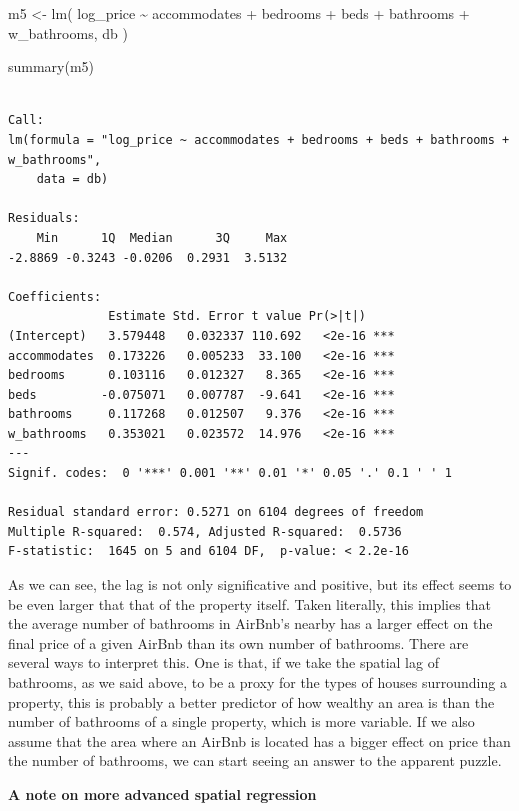 \documentclass[
  letterpaper,
  DIV=11,
  numbers=noendperiod,
  oneside]{scrreprt}
\newenvironment{Shaded}{\begin{snugshade}}{\end{snugshade}}
\newcommand{\FunctionTok}[1]{\textcolor[rgb]{0.28,0.35,0.67}{#1}}
\newcommand{\NormalTok}[1]{\textcolor[rgb]{0.00,0.23,0.31}{#1}}
\newcommand{\OtherTok}[1]{\textcolor[rgb]{0.00,0.23,0.31}{#1}}
\newcommand{\StringTok}[1]{\textcolor[rgb]{0.13,0.47,0.30}{#1}}
\begin{document}
\begin{Shaded}
\begin{Highlighting}[]
\NormalTok{m5 }\OtherTok{\textless{}{-}} \FunctionTok{lm}\NormalTok{(}
  \StringTok{\textquotesingle{}log\_price \textasciitilde{} accommodates + bedrooms + beds + bathrooms + w\_bathrooms\textquotesingle{}}\NormalTok{,}
\NormalTok{  db}
\NormalTok{)}

\FunctionTok{summary}\NormalTok{(m5)}
\end{Highlighting}
\end{Shaded}

\begin{verbatim}

Call:
lm(formula = "log_price ~ accommodates + bedrooms + beds + bathrooms + w_bathrooms", 
    data = db)

Residuals:
    Min      1Q  Median      3Q     Max 
-2.8869 -0.3243 -0.0206  0.2931  3.5132 

Coefficients:
              Estimate Std. Error t value Pr(>|t|)    
(Intercept)   3.579448   0.032337 110.692   <2e-16 ***
accommodates  0.173226   0.005233  33.100   <2e-16 ***
bedrooms      0.103116   0.012327   8.365   <2e-16 ***
beds         -0.075071   0.007787  -9.641   <2e-16 ***
bathrooms     0.117268   0.012507   9.376   <2e-16 ***
w_bathrooms   0.353021   0.023572  14.976   <2e-16 ***
---
Signif. codes:  0 '***' 0.001 '**' 0.01 '*' 0.05 '.' 0.1 ' ' 1

Residual standard error: 0.5271 on 6104 degrees of freedom
Multiple R-squared:  0.574, Adjusted R-squared:  0.5736 
F-statistic:  1645 on 5 and 6104 DF,  p-value: < 2.2e-16
\end{verbatim}

As we can see, the lag is not only significative and positive, but its
effect seems to be even larger that that of the property itself. Taken
literally, this implies that the average number of bathrooms in AirBnb's
nearby has a larger effect on the final price of a given AirBnb than its
own number of bathrooms. There are several ways to interpret this. One
is that, if we take the spatial lag of bathrooms, as we said above, to
be a proxy for the types of houses surrounding a property, this is
probably a better predictor of how wealthy an area is than the number of
bathrooms of a single property, which is more variable. If we also
assume that the area where an AirBnb is located has a bigger effect on
price than the number of bathrooms, we can start seeing an answer to the
apparent puzzle.

\textbf{A note on more advanced spatial regression}
\end{document}
